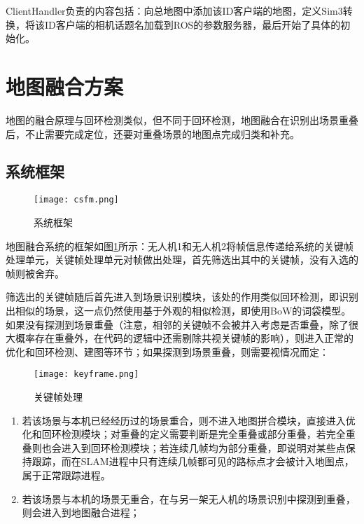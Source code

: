 ClientHandler负责的内容包括：向总地图中添加该ID客户端的地图，定义Sim3转换，将该ID客户端的相机话题名加载到ROS的参数服务器，最后开始了具体的初始化。





\section{地图融合方案}

地图的融合原理与回环检测类似，但不同于回环检测，地图融合在识别出场景重叠后，不止需要完成定位，还要对重叠场景的地图点完成归类和补充。

\subsection{系统框架} \label{3.4.0/}

\begin{figure}[!ht]
	\centering
	\texttt{[image: csfm.png]}
	\caption{系统框架}
	\label{fig13}
\end{figure}

地图融合系统的框架如图\ref{fig13}所示：无人机1和无人机2将帧信息传递给系统的关键帧处理单元，关键帧处理单元对帧做出处理，首先筛选出其中的关键帧，没有入选的帧则被舍弃。

筛选出的关键帧随后首先进入到场景识别模块，该处的作用类似回环检测，即识别出相似的场景，这一点仍然使用基于外观的相似检测，即使用BoW的词袋模型。如果没有探测到场景重叠（注意，相邻的关键帧不会被并入考虑是否重叠，除了很大概率存在重叠外，在代码的逻辑中还需剔除共视关键帧的影响），则进入正常的优化和回环检测、建图等环节；如果探测到场景重叠，则需要视情况而定\cite{forster2013collaborative}：
~\\
\begin{figure}[!ht]
	\centering
	\texttt{[image: keyframe.png]}
	\caption{关键帧处理}
	\label{fig-keyframe}
\end{figure}

\begin{enumerate}
	\item 若该场景与本机已经经历过的场景重合，则不进入地图拼合模块，直接进入优化和回环检测模块；对重叠的定义需要判断是完全重叠或部分重叠，若完全重叠则也会进入到回环检测模块；若连续几帧均为部分重叠，即说明对某些点保持跟踪，而在SLAM进程中只有连续几帧都可见的路标点才会被计入地图点，属于正常跟踪进程。
	\item 若该场景与本机的场景无重合，在与另一架无人机的场景识别中探测到重叠，则会进入到地图融合进程；
\end{enumerate}


